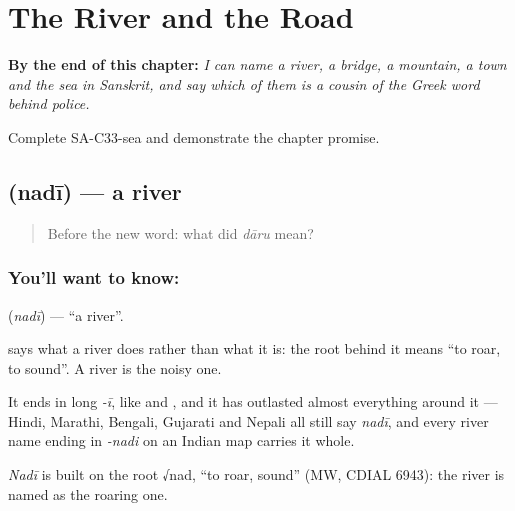 
\chapter{The River and the Road}
\label{ch:sa-land}

\begin{chapteropening}
\textbf{By the end of this chapter:} \emph{I can name a river, a bridge, a mountain, a town and the sea in Sanskrit, and say which of them is a cousin of the Greek word behind \emph{police}.}

Complete SA-C33-sea and demonstrate the chapter promise.
\end{chapteropening}

\section[\texorpdfstring{\sk{नदी} (nadī)}{नदी (nadī)}]{ (nadī) — a river}

\label{lesson:SA-C33-river}



\begin{quote}
Before the new word: what did \emph{dāru} mean?
\end{quote}

\subsection*{You'll want to know: }
\textbf{} (\emph{nadī}) — \textquotedblleft{}a river\textquotedblright{}.

\textbf{} says what a river does rather than what it is: the root behind it means \textquotedblleft{}to roar, to sound\textquotedblright{}. A river is the noisy one.

It ends in long \emph{-ī}, like \textbf{} and \textbf{}, and it has outlasted almost everything around it — Hindi, Marathi, Bengali, Gujarati and Nepali all still say \emph{nadī}, and every river name ending in \emph{-nadi} on an Indian map carries it whole.

\begin{cousinweb}
\emph{Nadī} is built on the root √nad, \textquotedblleft{}to roar, sound\textquotedblright{} (MW, CDIAL 6943): the river is named as the roaring one.
\end{cousinweb}

